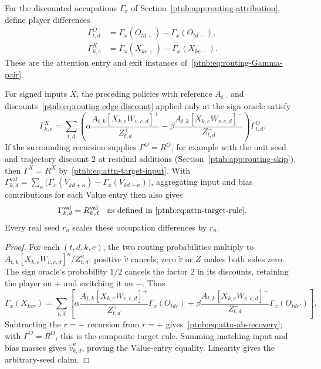 For the discounted occupations $\Gamma_x$ of Section~\ref{ptnb:app:routing-attribution}, define player differences
\begin{align}
    \Gamma^O_{t,d}&=\Gamma_x(O_{td+})-\Gamma_x(O_{td-}),\label{ptnb:eq:attn-Gamma-O}\\
    \Gamma^X_{k,e}&=\Gamma_x(X_{ke+})-\Gamma_x(X_{ke-}).\label{ptnb:eq:attn-Gamma-X}
\end{align}
These are the attention entry and exit instances of~\eqref{ptnb:eq:routing-Gamma-pair}.

\begin{theoremenv}\label{ptnb:thm:attn-ab-recovery}\label{thm:attention_ab_recovery}\label{ptnb:thm:attention}
For signed inputs $X$, the preceding policies with reference $A_{t,\cdot}$ and discounts~\eqref{ptnb:eq:routing-edge-discount} applied only at the sign oracle satisfy
\begin{equation}\label{ptnb:eq:attn-ab-recovery}
    \Gamma^X_{k,e}=\sum_{t,d}\left(
       \alpha\frac{A_{t,k}[X_{k,e}W_{v,e,d}]^+}{Z_{t,d}^+}
       -\beta\frac{A_{t,k}[X_{k,e}W_{v,e,d}]^-}{Z_{t,d}^-}
       \right)\Gamma^O_{t,d}.
\end{equation}
If the surrounding recursion supplies $\Gamma^O=R^O$, for example with the unit seed and trajectory discount $2$ at residual additions (Section~\ref{ptnb:app:routing-skip}), then $\Gamma^X=R^X$ by~\eqref{ptnb:eq:attn-target-input}. With $\Gamma^{\mathrm{val}}_{k,d}=\sum_\kappa\bigl(\Gamma_x(V_{kd+\kappa})-\Gamma_x(V_{kd-\kappa})\bigr)$, aggregating input and bias contributions for each Value entry then also gives
\begin{equation}\label{ptnb:eq:attn-Gamma-V-corollary}
    \Gamma^{\mathrm{val}}_{k,d}=R^{\mathrm{val}}_{k,d}
    \quad\text{as defined in~\eqref{ptnb:eq:attn-target-rule}}.
\end{equation}
Every real seed $r_u$ scales these occupation differences by $r_u$.
\end{theoremenv}
\begin{proof}
For each $(t,d,k,e)$, the two routing probabilities multiply to $A_{t,k}[X_{k,e}W_{v,e,d}]^\kappa/Z_{t,d}^\kappa$: positive $\tilde v$ cancels; zero $\tilde v$ or $Z$ makes both sides zero. The sign oracle's probability $1/2$ cancels the factor $2$ in its discounts, retaining the player on $+$ and switching it on $-$. Thus
\begin{equation}\label{ptnb:eq:attn-Gamma-X-recursion}
    \Gamma_x(X_{ker})=\sum_{t,d}\left[
      \alpha\frac{A_{t,k}[X_{k,e}W_{v,e,d}]^+}{Z_{t,d}^+}\Gamma_x(O_{tdr})
      +\beta\frac{A_{t,k}[X_{k,e}W_{v,e,d}]^-}{Z_{t,d}^-}\Gamma_x(O_{tdr'})
    \right].
\end{equation}
Subtracting the $r=-$ recursion from $r=+$ gives~\eqref{ptnb:eq:attn-ab-recovery}; with $\Gamma^O=R^O$, this is the composite target rule. Summing matching input and bias masses gives $\tilde v_{k,d}^\kappa$, proving the Value-entry equality. Linearity gives the arbitrary-seed claim.
\end{proof}

